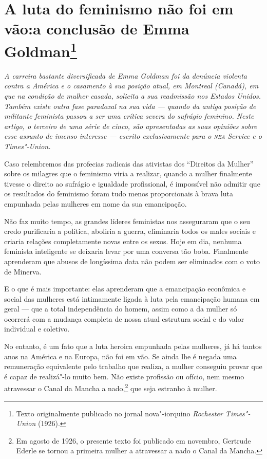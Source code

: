 \chapter[A luta do feminismo não foi em vão]{A luta do feminismo não foi em vão:\break a conclusão de Emma Goldman\footnote{Texto originalmente publicado no
  jornal nova"-iorquino \emph{Rochester Times"-Union} (1926).}}

\textit{A carreira bastante diversificada de Emma Goldman foi da
denúncia violenta contra a América e o casamento à sua posição atual, em
Montreal (Canadá), em que na condição de mulher casada, solicita a sua readmissão nos Estados Unidos. Também existe outra fase paradoxal na sua
vida --- quando da antiga posição de militante feminista passou a ser
uma crítica severa do sufrágio feminino. Neste artigo, o terceiro de uma
série de cinco, são apresentadas as suas opiniões sobre esse assunto de
imenso interesse --- escrito exclusivamente para o \emph{\textsc{nea} Service} e o
\emph{Times"-Union.}}

\begin{center}
\end{center}

Caso relembremos das profecias radicais das ativistas dos ``Direitos da
Mulher'' sobre os milagres que o feminismo viria a realizar, quando a
mulher finalmente tivesse o direito ao sufrágio e igualdade
profissional, é impossível não admitir que os resultados do feminismo
foram tudo menos proporcionais à brava luta empunhada pelas mulheres em
nome da sua emancipação.

Não faz muito tempo, as grandes líderes feministas nos asseguraram
que o seu credo purificaria a política, aboliria a guerra, eliminaria
todos os males sociais e criaria relações completamente novas entre os
sexos. Hoje em dia, nenhuma feminista inteligente se deixaria levar por
uma conversa tão boba. Finalmente aprenderam que abusos de longíssima
data não podem ser eliminados com o voto de Minerva.

E o que é mais importante: elas aprenderam que a emancipação econômica e
social das mulheres está intimamente ligada à luta pela emancipação
humana em geral --- que a total independência do homem, assim como a da
mulher só ocorrerá com a mudança completa de nossa atual estrutura
social e do valor individual e coletivo.

No entanto, é um fato que a luta heroica empunhada pelas mulheres, já há
tantos anos na América e na Europa, não foi em vão. Se ainda lhe é
negada uma remuneração equivalente pelo trabalho que realiza, a mulher
conseguiu provar que é capaz de realizá"-lo muito bem. Não existe
profissão ou ofício, nem mesmo atravessar o Canal da Mancha a
nado,\footnote{Em agosto de 1926, o presente texto foi publicado em
  novembro, Gertrude Ederle se tornou a primeira mulher a atravessar a
  nado o Canal da Mancha.} que seja estranho à mulher.

